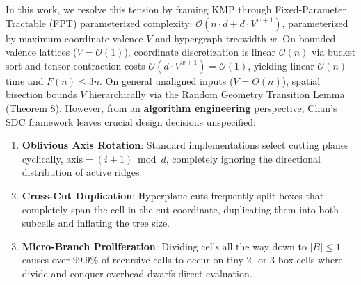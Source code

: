 \documentclass[11pt,a4paper]{article}
\theoremstyle{plain}
\theoremstyle{definition}
\begin{document}
In this work, we resolve this tension by framing KMP through Fixed-Parameter Tractable (FPT) parameterized complexity: $\mathcal{O}(n \cdot d + d \cdot V^{w+1})$, parameterized by maximum coordinate valence $V$ and hypergraph treewidth $w$. On bounded-valence lattices ($V = \mathcal{O}(1)$), coordinate discretization is linear $\mathcal{O}(n)$ via bucket sort and tensor contraction costs $\mathcal{O}(d \cdot V^{w+1}) = \mathcal{O}(1)$, yielding linear $\mathcal{O}(n)$ time and $F(n) \le 3n$. On general unaligned inputs ($V = \Theta(n)$), spatial bisection bounds $V$ hierarchically via the Random Geometry Transition Lemma (Theorem 8). However, from an \textbf{algorithm engineering} perspective, Chan's SDC framework leaves crucial design decisions unspecified:
\begin{enumerate}
    \item \textbf{Oblivious Axis Rotation}: Standard implementations select cutting planes cyclically, $\text{axis} = (i + 1) \bmod d$, completely ignoring the directional distribution of active ridges.
    \item \textbf{Cross-Cut Duplication}: Hyperplane cuts frequently split boxes that completely span the cell in the cut coordinate, duplicating them into both subcells and inflating the tree size.
    \item \textbf{Micro-Branch Proliferation}: Dividing cells all the way down to $|B| \le 1$ causes over $99.9\%$ of recursive calls to occur on tiny 2- or 3-box cells where divide-and-conquer overhead dwarfs direct evaluation.
\end{enumerate}
\end{document}
